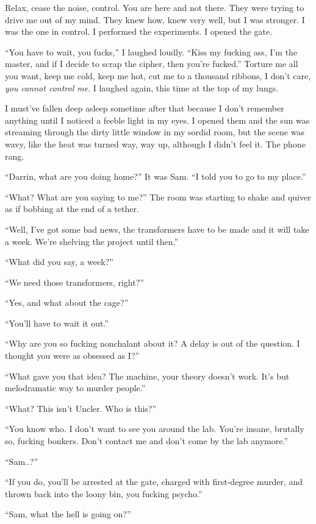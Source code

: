 Relax, cease the noise, control. You are here and not there. They were
trying to drive me out of my mind. They knew how, knew very well, but I
was stronger. I was the one in control. I performed the experiments. I
opened the gate.

``You have to wait, you fucks,'' I laughed loudly. ``Kiss my fucking
ass, I'm the master, and if I decide to scrap the cipher, then you're
fucked.'' Torture me all you want, keep me cold, keep me hot, cut me to
a thousand ribbons, I don't care, \emph{you cannot control me}. I
laughed again, this time at the top of my lungs.

I must've fallen deep asleep sometime after that because I don't
remember anything until I noticed a feeble light in my eyes. I opened
them and the sun was streaming through the dirty little window in my
sordid room, but the scene was wavy, like the heat was turned way, way
up, although I didn't feel it. The phone rang.

``Darrin, what are you doing home?'' It was Sam. ``I told you to go to
my place.''

``What? What are you saying to me?'' The room was starting to shake and
quiver as if bobbing at the end of a tether.

``Well, I've got some bad news, the transformers have to be made and it
will take a week. We're shelving the project until then.''

``What did you say, a week?''

``We need those transformers, right?''

``Yes, and what about the cage?''

``You'll have to wait it out.''

``Why are you so fucking nonchalant about it? A delay is out of the
question. I thought you were as obsessed as I?''

``What gave you that idea? The machine, your theory doesn't work. It's
but melodramatic way to murder people.''

``What? This isn't Uncler. Who is this?''

``You know who. I don't want to see you around the lab. You're insane,
brutally so, fucking bonkers. Don't contact me and don't come by the lab
anymore.''

``Sam..?''

``If you do, you'll be arrested at the gate, charged with first-degree
murder, and thrown back into the loony bin, you fucking psycho.''

``Sam, what the hell is going on?''

